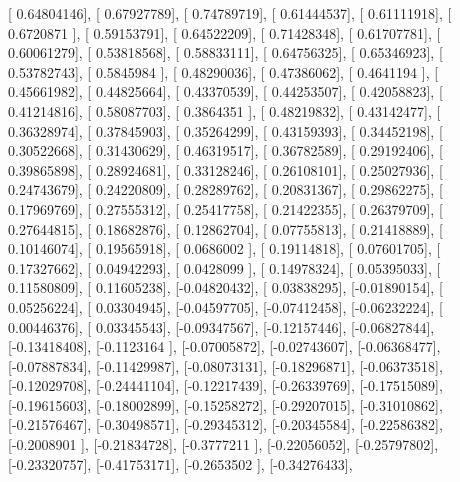 \documentclass{article}
\begin{document}
       [ 0.64804146],
       [ 0.67927789],
       [ 0.74789719],
       [ 0.61444537],
       [ 0.61111918],
       [ 0.6720871 ],
       [ 0.59153791],
       [ 0.64522209],
       [ 0.71428348],
       [ 0.61707781],
       [ 0.60061279],
       [ 0.53818568],
       [ 0.58833111],
       [ 0.64756325],
       [ 0.65346923],
       [ 0.53782743],
       [ 0.5845984 ],
       [ 0.48290036],
       [ 0.47386062],
       [ 0.4641194 ],
       [ 0.45661982],
       [ 0.44825664],
       [ 0.43370539],
       [ 0.44253507],
       [ 0.42058823],
       [ 0.41214816],
       [ 0.58087703],
       [ 0.3864351 ],
       [ 0.48219832],
       [ 0.43142477],
       [ 0.36328974],
       [ 0.37845903],
       [ 0.35264299],
       [ 0.43159393],
       [ 0.34452198],
       [ 0.30522668],
       [ 0.31430629],
       [ 0.46319517],
       [ 0.36782589],
       [ 0.29192406],
       [ 0.39865898],
       [ 0.28924681],
       [ 0.33128246],
       [ 0.26108101],
       [ 0.25027936],
       [ 0.24743679],
       [ 0.24220809],
       [ 0.28289762],
       [ 0.20831367],
       [ 0.29862275],
       [ 0.17969769],
       [ 0.27555312],
       [ 0.25417758],
       [ 0.21422355],
       [ 0.26379709],
       [ 0.27644815],
       [ 0.18682876],
       [ 0.12862704],
       [ 0.07755813],
       [ 0.21418889],
       [ 0.10146074],
       [ 0.19565918],
       [ 0.0686002 ],
       [ 0.19114818],
       [ 0.07601705],
       [ 0.17327662],
       [ 0.04942293],
       [ 0.0428099 ],
       [ 0.14978324],
       [ 0.05395033],
       [ 0.11580809],
       [ 0.11605238],
       [-0.04820432],
       [ 0.03838295],
       [-0.01890154],
       [ 0.05256224],
       [ 0.03304945],
       [-0.04597705],
       [-0.07412458],
       [-0.06232224],
       [ 0.00446376],
       [ 0.03345543],
       [-0.09347567],
       [-0.12157446],
       [-0.06827844],
       [-0.13418408],
       [-0.1123164 ],
       [-0.07005872],
       [-0.02743607],
       [-0.06368477],
       [-0.07887834],
       [-0.11429987],
       [-0.08073131],
       [-0.18296871],
       [-0.06373518],
       [-0.12029708],
       [-0.24441104],
       [-0.12217439],
       [-0.26339769],
       [-0.17515089],
       [-0.19615603],
       [-0.18002899],
       [-0.15258272],
       [-0.29207015],
       [-0.31010862],
       [-0.21576467],
       [-0.30498571],
       [-0.29345312],
       [-0.20345584],
       [-0.22586382],
       [-0.2008901 ],
       [-0.21834728],
       [-0.3777211 ],
       [-0.22056052],
       [-0.25797802],
       [-0.23320757],
       [-0.41753171],
       [-0.2653502 ],
       [-0.34276433],
\end{document}
